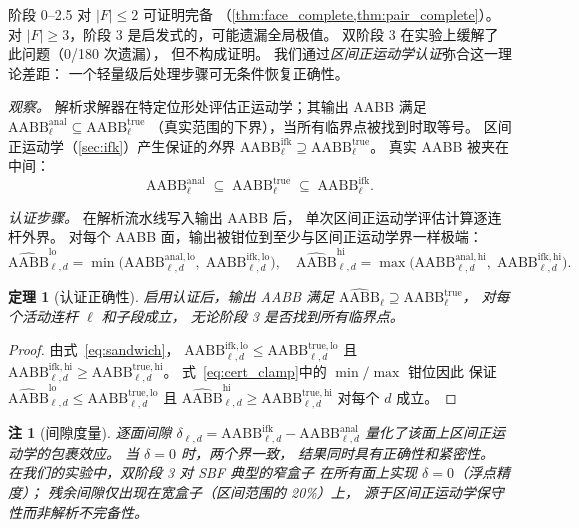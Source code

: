 \documentclass[journal]{IEEEtran}
\newtheorem{theorem}{定理}
\newtheorem{remark}{注}
\newcommand{\AABB}{\text{AABB}}
\begin{document}
阶段 0--2.5 对 $|F|\leq 2$ 可证明完备
（\cref{thm:face_complete,thm:pair_complete}）。
对 $|F|\geq 3$，阶段 3 是启发式的，可能遗漏全局极值。
双阶段 3 在实验上缓解了此问题（0/180 次遗漏），
但不构成证明。
我们通过\emph{区间正运动学认证}弥合这一理论差距：
一个轻量级后处理步骤可无条件恢复正确性。

\emph{观察。}
解析求解器在特定位形处评估正运动学；其输出 AABB 满足
$\AABB^{\mathrm{anal}}_\ell \subseteq \AABB^{\mathrm{true}}_\ell$
（真实范围的下界），当所有临界点被找到时取等号。
区间正运动学（\cref{sec:ifk}）产生保证的\emph{外}界
$\AABB^{\mathrm{ifk}}_\ell \supseteq \AABB^{\mathrm{true}}_\ell$。
真实 AABB 被夹在中间：
\begin{equation}\label{eq:sandwich}
  \AABB^{\mathrm{anal}}_\ell
  \;\subseteq\; \AABB^{\mathrm{true}}_\ell
  \;\subseteq\; \AABB^{\mathrm{ifk}}_\ell.
\end{equation}

\emph{认证步骤。}
在解析流水线写入输出 AABB 后，
单次区间正运动学评估计算逐连杆外界。
对每个 AABB 面，输出被钳位到至少与区间正运动学界一样极端：
\begin{equation}\label{eq:cert_clamp}
  \widehat{\AABB}_{\ell,d}^{\mathrm{lo}}
    = \min\!\bigl(\AABB_{\ell,d}^{\mathrm{anal,lo}},\;
                   \AABB_{\ell,d}^{\mathrm{ifk,lo}}\bigr),
  \quad
  \widehat{\AABB}_{\ell,d}^{\mathrm{hi}}
    = \max\!\bigl(\AABB_{\ell,d}^{\mathrm{anal,hi}},\;
                   \AABB_{\ell,d}^{\mathrm{ifk,hi}}\bigr).
\end{equation}

\begin{theorem}[认证正确性]\label{thm:cert_sound}
启用认证后，输出 AABB 满足
$\widehat{\AABB}_\ell \supseteq \AABB^{\mathrm{true}}_\ell$，
对每个活动连杆 $\ell$ 和子段成立，
无论阶段 3 是否找到所有临界点。
\end{theorem}
\begin{proof}
由式~\eqref{eq:sandwich}，
$\AABB_{\ell,d}^{\mathrm{ifk,lo}} \leq
 \AABB_{\ell,d}^{\mathrm{true,lo}}$
且
$\AABB_{\ell,d}^{\mathrm{ifk,hi}} \geq
 \AABB_{\ell,d}^{\mathrm{true,hi}}$。
式~\eqref{eq:cert_clamp}中的 $\min/\max$ 钳位因此
保证 $\widehat{\AABB}_{\ell,d}^{\mathrm{lo}} \leq
\AABB_{\ell,d}^{\mathrm{true,lo}}$
且 $\widehat{\AABB}_{\ell,d}^{\mathrm{hi}} \geq
\AABB_{\ell,d}^{\mathrm{true,hi}}$
对每个 $d$ 成立。
\end{proof}

\begin{remark}[间隙度量]
逐面间隙
$\delta_{\ell,d}
  = \AABB^{\mathrm{ifk}}_{\ell,d} - \AABB^{\mathrm{anal}}_{\ell,d}$
量化了该面上区间正运动学的包裹效应。
当 $\delta = 0$ 时，两个界一致，
结果\emph{同时具有正确性和紧密性}。
在我们的实验中，双阶段 3 对 SBF 典型的窄盒子
在所有面上实现 $\delta = 0$（浮点精度）；
残余间隙仅出现在宽盒子（区间范围的 20\%）上，
源于区间正运动学保守性而非解析不完备性。
\end{remark}
\end{document}
